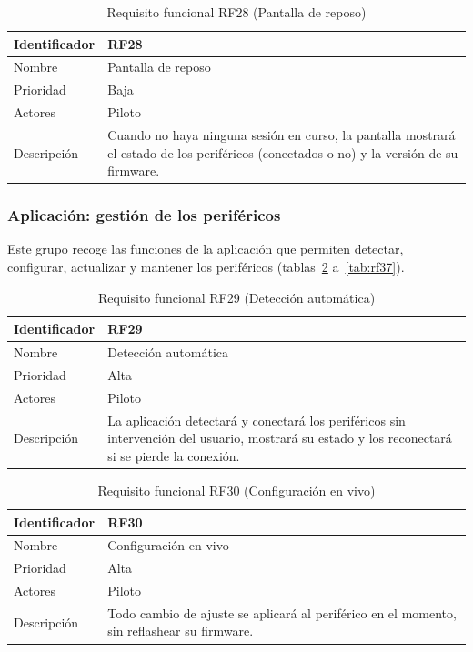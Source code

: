 \begin{table}[H]
	\centering
	\renewcommand{\arraystretch}{2}
	\begin{tabular}{|l|p{10cm}|}
		\hline
		Identificador & RF28 \\
		\hline
		Nombre & Pantalla de reposo \\
		\hline
		Prioridad & Baja \\
		\hline
		Actores & Piloto \\
		\hline
		Descripción & Cuando no haya ninguna sesión en curso, la pantalla mostrará el estado de los periféricos (conectados o no) y la versión de su firmware. \\
		\hline
	\end{tabular}
	\caption{Requisito funcional RF28 (Pantalla de reposo)}
	\label{tab:rf28}
\end{table}

\subsubsection{Aplicación: gestión de los periféricos}

Este grupo recoge las funciones de la aplicación que permiten detectar, configurar, actualizar y mantener los periféricos (tablas~\ref{tab:rf29} a~\ref{tab:rf37}).

\begin{table}[H]
	\centering
	\renewcommand{\arraystretch}{2}
	\begin{tabular}{|l|p{10cm}|}
		\hline
		Identificador & RF29 \\
		\hline
		Nombre & Detección automática \\
		\hline
		Prioridad & Alta \\
		\hline
		Actores & Piloto \\
		\hline
		Descripción & La aplicación detectará y conectará los periféricos sin intervención del usuario, mostrará su estado y los reconectará si se pierde la conexión. \\
		\hline
	\end{tabular}
	\caption{Requisito funcional RF29 (Detección automática)}
	\label{tab:rf29}
\end{table}

\begin{table}[H]
	\centering
	\renewcommand{\arraystretch}{2}
	\begin{tabular}{|l|p{10cm}|}
		\hline
		Identificador & RF30 \\
		\hline
		Nombre & Configuración en vivo \\
		\hline
		Prioridad & Alta \\
		\hline
		Actores & Piloto \\
		\hline
		Descripción & Todo cambio de ajuste se aplicará al periférico en el momento, sin reflashear su firmware. \\
		\hline
	\end{tabular}
	\caption{Requisito funcional RF30 (Configuración en vivo)}
	\label{tab:rf30}
\end{table}

